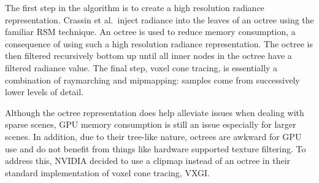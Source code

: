 The first step in the algorithm is to create a high resolution radiance representation. Crassin et al.\ inject radiance into the leaves of an octree using the familiar RSM technique. An octree is used to reduce memory consumption, a consequence of using such a high resolution radiance representation. The octree is then filtered recursively bottom up until all inner nodes in the octree have a filtered radiance value. The final step, voxel cone tracing, is essentially a combination of raymarching and mipmapping: samples come from successively lower levels of detail.


Although the octree representation does help alleviate issues when dealing with sparse scenes, GPU memory consumption is still an issue especially for larger scenes. In addition, due to their tree-like nature, octrees are awkward for GPU use and do not benefit from things like hardware supported texture filtering. To address this, NVIDIA decided to use a clipmap instead of an octree in their standard implementation of voxel cone tracing, VXGI.


\iffalse

* Global Illumination using Voxel Cone Tracing
- octrees vs clipmaps vs 3d textures (vs warped)
- proprietary
- vxgi: clipmaps, in UE4 but still closed source
    - octree -> no hw filtering, complex but higher resolution
    - multiple levels of radiance -> allows gathering more high frequency indirect lighting information

* some common issues with other works (this could also go in intro)
- closed source
- implementation details matter -> difficult to understand from research or white papers
- highly variable performance based on unrelated things (OpenGL vs DirectX? modern OpenGL? mipmaps, normal maps, shading model, mesh optimizations, etc)
- research renderers or full game engines -> difficult to understand
\fi